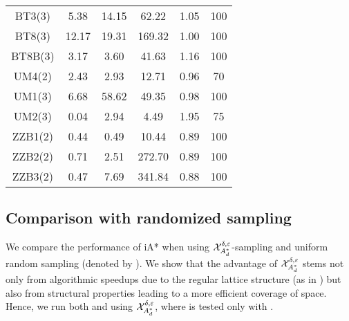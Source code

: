 \begin{table}[]
\begin{tabular}{|c||ccc|c|c|}
\cellcolor[HTML]{ECF4FF}BT3(3) & \multicolumn{1}{c|}{5.38} & \multicolumn{1}{c|}{14.15} & 62.22 & 1.05 & 100 \\
\cellcolor[HTML]{ECF4FF}BT8(3) & \multicolumn{1}{c|}{12.17} & \multicolumn{1}{c|}{19.31} & 169.32 & 1.00 & 100 \\
\cellcolor[HTML]{ECF4FF}BT8B(3) & \multicolumn{1}{c|}{3.17} & \multicolumn{1}{c|}{3.60} & 41.63 & 1.16 & 100 \\ \hline
\cellcolor[HTML]{ECF4FF}UM4(2) & \multicolumn{1}{c|}{2.43} & \multicolumn{1}{c|}{2.93} & 12.71 & 0.96 & 70 \\
\cellcolor[HTML]{ECF4FF}UM1(3) & \multicolumn{1}{c|}{6.68} & \multicolumn{1}{c|}{58.62} & 49.35 & 0.98 & 100 \\
\cellcolor[HTML]{ECF4FF}UM2(3) & \multicolumn{1}{c|}{0.04} & \multicolumn{1}{c|}{2.94} & 4.49 & 1.95 & 75 \\ \hline
\cellcolor[HTML]{ECF4FF}ZZB1(2) & \multicolumn{1}{c|}{0.44} & \multicolumn{1}{c|}{0.49} & 10.44 & 0.89 & 100 \\
\cellcolor[HTML]{ECF4FF}ZZB2(2) & \multicolumn{1}{c|}{0.71} & \multicolumn{1}{c|}{2.51} & 272.70 & 0.89 & 100 \\
\cellcolor[HTML]{ECF4FF}ZZB3(2) & \multicolumn{1}{c|}{0.47} & \multicolumn{1}{c|}{7.69} & 341.84 & 0.88 & 100 \\ \hline
\end{tabular}
\end{table}

\subsection{Comparison with randomized sampling}
We compare the performance of iA* when using $\mathcal{X}_{A_d^*}^{\delta,\varepsilon}$-sampling and uniform random sampling (denoted by \rnd). We show that the advantage of $\mathcal{X}_{A_d^*}^{\delta,\varepsilon}$ stems not only from algorithmic speedups due to the regular lattice structure (as in \loc) but also from structural properties leading to a more efficient coverage of space. Hence, we run both \glo and \loc using $\mathcal{X}_{A_d^*}^{\delta,\varepsilon}$, where \rnd is tested only with \glo. 

